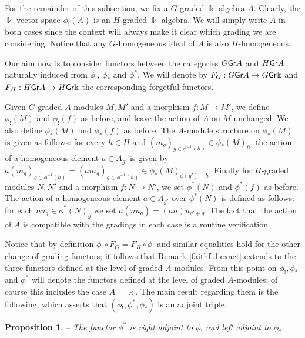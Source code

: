\documentclass[twoside,11pt]{article}
\renewcommand{\k}{\Bbbk}
\newcommand{\GrMod}{{\sf Gr}}
\newtheorem{subproposition}[subtheorem]{Proposition}
\begin{document}
For the remainder of this subsection, we fix a $G$-graded $\k$-algebra $A$. Clearly, the
$\k$-vector space $\phi_!(A)$ is an $H$-graded $\k$-algebra. We will simply write $A$ in both
cases since the context will always make it clear which grading we are considering. Notice
that any $G$-homogeneous ideal of $A$ is also $H$-homogeneous.

Our aim now is to consider functors between the categories $G\GrMod A$ and $H\GrMod A$
naturally induced from $\phi_!$, $\phi_*$ and $\phi^*$. We will denote by $F_G : G\GrMod A
\to G\GrMod\k$ and $F_H : H\GrMod A \to H\GrMod\k$ the corresponding forgetful functors. 

Given $G$-graded $A$-modules $M, M'$ and a morphism $f: M \to M'$, we define $\phi_!(M)$
and $\phi_!(f)$ as before, and leave the action of $A$ on $M$ unchanged. We also define
$\phi_*(M)$ and $\phi_*(f)$ as before. The $A$-module structure on $\phi_*(M)$ is given as
follows: for every $h \in H$ and $(m_g)_{g \in \phi^{-1}(h)} \in \phi_*(M)_h$, the action
of a homogeneous element $a \in A_{g'}$ is given by $a (m_g)_{g \in \phi^{-1}(h)} =
(am_g)_{g \in \phi^{-1}(h)} \in \phi_*(M)_{\phi(g') + h}$. Finally for $H$-graded modules
$N, N'$ and a morphism $f: N \to N'$, we set $\phi^*(N)$ and $\phi^*(f)$ as before. The
action of a homogeneous element $a \in A_{g'}$ over $\phi^*(N)$ is defined as follows: for
each $n u_g \in \phi^*(N)_g$ we set $a (n u_g) = (an)u_{g'+g}$. The fact that the action
of $A$ is compatible with the gradings in each case is a routine verification.

Notice that by definition $\phi_! \circ F_G = F_H \circ \phi_!$ and similar equalities
hold for the other change of grading functors; it follows that Remark \ref{faithful-exact}
extends to the three functors defined at the level of graded $A$-modules. From this
point on $\phi_!, \phi_*$ and $\phi^*$ will denote the functors defined at the level
of graded $A$-modules; of course this includes the case $A = \k$. The main result
regarding them is the following, which asserts that $(\phi_!, \phi^*, \phi_*)$ is an
adjoint triple.

\begin{subproposition} -- \label{true-adjoints}
The functor $\phi^*$ is right adjoint to $\phi_!$ and left adjoint to $\phi_*$
\end{subproposition}
\end{document}
